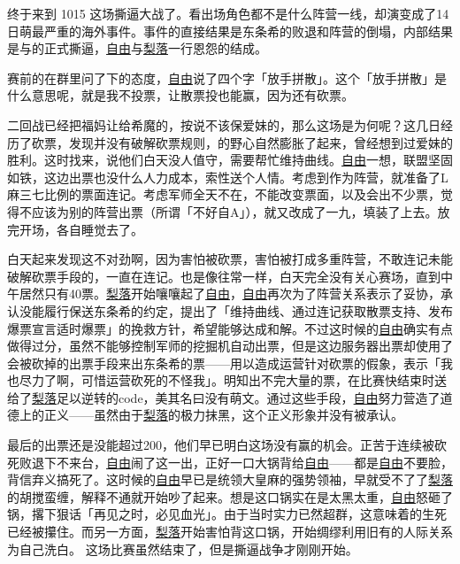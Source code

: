 终于来到 1015 这场撕逼大战了。看出场角色都不是什么阵营一线，却演变成了14日萌最严重的海外事件。事件的直接结果是东条希的败退和阵营的倒塌，内部结果是与的正式撕逼，\uline{自由}与\uline{梨落}一行恩怨的结成。

赛前的在群里问了下的态度，\uline{自由}说了四个字「放手拼散」。这个「放手拼散」是什么意思呢，就是我不投票，让散票投也能赢，因为还有砍票。

二回战已经把福妈让给希魔的，按说不该保爱妹的，那么这场是为何呢？这几日经历了砍票，发现并没有破解砍票规则，的野心自然膨胀了起来，曾经想到过爱妹的胜利。这时找来，说他们白天没人值守，需要帮忙维持曲线。\uline{自由}一想，联盟坚固如铁，这边出票也没什么人力成本，索性送个人情。考虑到作为阵营，就准备了L麻三七比例的票面连记。考虑军师全天不在，不能改变票面，以及会出不少票，觉得不应该为别的阵营出票（所谓「不好自A」），就又改成了一九，填装了上去。放完开场，各自睡觉去了。

白天起来发现这不对劲啊，因为害怕被砍票，害怕被打成多重阵营，不敢连记未能破解砍票手段的，一直在连记。也是像往常一样，白天完全没有关心赛场，直到中午居然只有40票。\uline{梨落}开始嚷嚷起了\uline{自由}，\uline{自由}再次为了阵营关系表示了妥协，承认没能履行保送东条希的约定，提出了「维持曲线、通过连记获取散票支持、发布爆票宣言适时爆票」的挽救方针，希望能够达成和解。不过这时候的\uline{自由}确实有点做得过分，虽然不能够控制军师的挖掘机自动出票，但是这边服务器出票却使用了会被砍掉的出票手段来出东条希的票——用以造成运营针对砍票的假象，表示「我也尽力了啊，可惜运营砍死的不怪我」。明知出不完大量的票，在比赛快结束时送给了\uline{梨落}足以逆转的code，美其名曰没有萌文。通过这些手段，\uline{自由}努力营造了道德上的正义——虽然由于\uline{梨落}的极力抹黑，这个正义形象并没有被承认。

最后的出票还是没能超过200，他们早已明白这场没有赢的机会。正苦于连续被砍死败退下不来台，\uline{自由}闹了这一出，正好一口大锅背给\uline{自由}——都是\uline{自由}不要脸，背信弃义搞死了。这时候的\uline{自由}早已是统领大皇麻的强势领袖，早就受不了了\uline{梨落}的胡搅蛮缠，解释不通就开始吵了起来。想是这口锅实在是太黑太重，\uline{自由}怒砸了锅，撂下狠话「再见之时，必见血光」。由于当时实力已然超群，这意味着的生死已经被攥住。而另一方面，\uline{梨落}开始害怕背这口锅，开始绸缪利用旧有的人际关系为自己洗白。
这场比赛虽然结束了，但是撕逼战争才刚刚开始。

